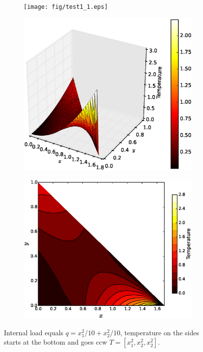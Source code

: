\documentclass[10pt, a4paper]{article}
\begin{document}
\begin{figure}[H]
\centering
	\begin{subfigure}[H]{0.3\textwidth}
		\texttt{[image: fig/test1\_1.eps]}
		\caption{}
		\label{fig:1}
	\end{subfigure}
	\begin{subfigure}[H]{0.33\textwidth}
		\includegraphics[width=\textwidth]{fig/test1_2.eps}
		\caption{}
		\label{fig:2}
	\end{subfigure}
	\begin{subfigure}[H]{0.33\textwidth}
		\includegraphics[width=\textwidth]{fig/test1_3.eps}
		\caption{}
		\label{fig:3}
	\end{subfigure}
	\caption{Internal load equals $q=x_1^2/10 + x_2^2/10$, temperature on the sides starts at the bottom and goes ccw $T=[x_1^2, x_2^2, x_2^2]$.}
	\label{fig:3_1}
\end{figure}
\end{document}

